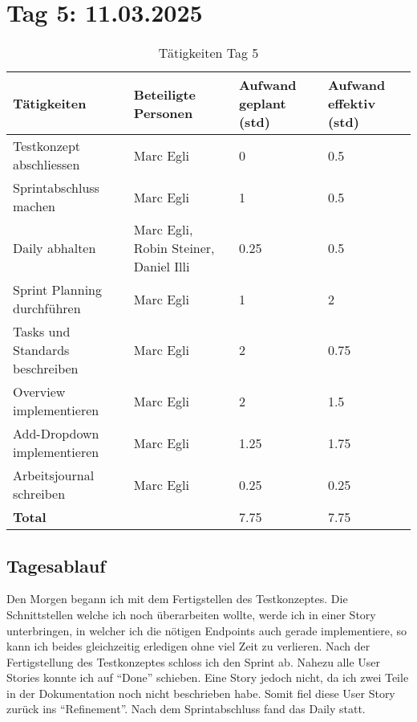 \section{Tag 5: 11.03.2025}
\begin{table}[H]
    \begin{tabular}{|L{0.4\textwidth}|C{60pt}|C{60pt}|C{60pt}|}
        \hline
        \color{white}Tätigkeiten & \color{white}Beteiligte \color{white}Personen & \color{white}Aufwand geplant (std) & \color{white}Aufwand effektiv (std) \\
        \hline
         Testkonzept abschliessen & Marc Egli & 0 & 0.5 \\
        \hline
        Sprintabschluss machen & Marc Egli & 1 & 0.5 \\
        \hline
        Daily abhalten & Marc Egli, Robin Steiner, Daniel Illi & 0.25 & 0.5 \\
        \hline
        Sprint Planning durchführen & Marc Egli & 1 & 2 \\
        \hline
        Tasks und Standards beschreiben & Marc Egli & 2 & 0.75 \\
        \hline
        Overview implementieren & Marc Egli & 2 & 1.5 \\
        \hline
        Add-Dropdown implementieren & Marc Egli & 1.25 & 1.75 \\
        \hline
        Arbeitsjournal schreiben & Marc Egli & 0.25 & 0.25 \\
        \textbf{Total} &  & 7.75 & 7.75 \\
        \hline
    \end{tabular}
    \caption{Tätigkeiten Tag 5}
\end{table}

\subsection*{Tagesablauf}
Den Morgen begann ich mit dem Fertigstellen des Testkonzeptes. Die Schnittstellen welche ich noch überarbeiten wollte, werde
ich in einer Story unterbringen, in welcher ich die nötigen Endpoints auch gerade implementiere, so kann ich beides gleichzeitig erledigen 
ohne viel Zeit zu verlieren. Nach der Fertigstellung des Testkonzeptes schloss ich den Sprint ab. Nahezu alle User Stories konnte ich auf ``Done''
schieben. Eine Story jedoch nicht, da ich zwei Teile in der Dokumentation noch nicht beschrieben habe. Somit fiel diese User Story zurück ins 
``Refinement''. Nach dem Sprintabschluss fand das Daily statt.

